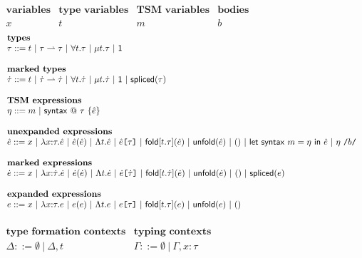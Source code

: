 {\begin{figure}$\begin{array}{llllll}
\textbf{variables} & \textbf{type variables} & \textbf{TSM variables} & \textbf{bodies}\\
x & t & m & b\\~\end{array}$\\
$\begin{array}{l}
\textbf{types}\\
\tau ::= t ~\vert~ \parr{\tau}{\tau} ~\vert~ \forallt{t}{\tau} ~\vert~ \rect{t}{\tau} ~\vert~ \unitt\\
~\\
\textbf{marked types}\\
\mtau ::= t ~\vert~ \parr{\mtau}{\mtau} ~\vert~ \forallt{t}{\mtau} ~\vert~ \rect{t}{\mtau} ~\vert~ \unitt ~\vert~ \mtspliced{\tau}\\
~\\
\textbf{TSM expressions}\\
\tsme ::= \tsmv ~\vert~ \utsmdef{\tau}{\ue}
\\~\\
\textbf{unexpanded expressions}\\
\ue ::= {x} ~\vert~ \lam{x}{\tau}{\ue} ~\vert~ \ue(\ue) ~\vert~ \Lam{t}{\ue} ~\vert~ \App{\ue}{\tau} ~\vert~ \fold{t}{\tau}{\ue} ~\vert~ \unfold{\ue} ~\vert~ \triv ~\vert~ \uletsyntax{\tsmv}{\tsme}{\ue} ~\vert~ \utsmapp{\eta}{b}
\\~\\
\textbf{marked expressions}\\
\me ::= x ~\vert~ \lam{x}{\mtau}{\me} ~\vert~ \app{\me}{\me} ~\vert~ \Lam{t}{\me} ~|~ \App{\me}{\mtau} ~\vert~ \fold{t}{\mtau}{\me} ~\vert~ \unfold{\me} ~\vert~ \triv ~\vert~ \mspliced{e}
\\~\\
\textbf{expanded expressions}\\
e ::= x ~\vert~ \lam{x}{\tau}{e} ~\vert~ \app{e}{e} ~\vert~ \Lam{t}{e} ~\vert~ \App{e}{\tau} ~\vert~ \fold{t}{\tau}{e} ~\vert~ \unfold{e} ~\vert~ \triv\end{array}\\\vspace{8px}$
~\\
$\begin{array}{ll}
\textbf{type formation contexts} & \textbf{typing contexts}\\
\Delta ::= \emptyset ~\vert~ \Delta, t & \Gamma ::= \emptyset ~\vert~ \Gamma, x : \tau
\end{array}$


\end{figure}}

